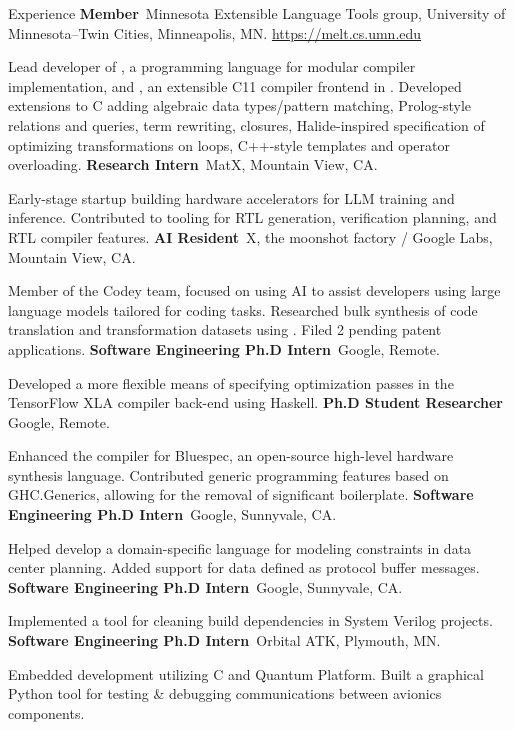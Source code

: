 \begin{rubric}{Experience}
\entry*[2014 -- $\cdots$]%
	\textbf{Member}\, Minnesota Extensible Language Tools group, University of Minnesota--Twin Cities, Minneapolis, MN.
	\url{https://melt.cs.umn.edu}
	\par Lead developer of \silver{}, a programming language for modular compiler
	implementation,
	and \ableC{}, an extensible C11 compiler frontend in \silver{}.
	Developed extensions to C adding algebraic data types/pattern matching, Prolog-style relations and queries,
	term rewriting, closures, Halide-inspired specification of optimizing transformations on loops, C++-style templates and operator overloading.
%
\entry*[2024]%
	\textbf{Research Intern}\, MatX, Mountain View, CA.
	\par Early-stage startup building hardware accelerators for LLM training and inference.
	Contributed to tooling for RTL generation, verification planning, and RTL compiler features.
%
\entry*[2021 -- 2023]%
	\textbf{AI Resident}\, X, the moonshot factory / Google Labs, Mountain View, CA.
	\par Member of the Codey team, focused on using AI to assist developers using large language models tailored for coding tasks.
	Researched bulk synthesis of code translation and transformation datasets using \silver{}.
	Filed 2 pending patent applications.
%
\entry*[2021]%
	\textbf{Software Engineering Ph.D Intern}\, Google, Remote.
	\par Developed a more flexible means of specifying optimization passes in the TensorFlow XLA compiler back-end using Haskell.
%
\entry*[2020 -- 2021]%
	\textbf{Ph.D Student Researcher}\, Google, Remote.
	\par Enhanced the compiler for Bluespec, an open-source high-level hardware synthesis language.
	Contributed generic programming features based on GHC.Generics, allowing for the removal of significant boilerplate.
%
\entry*[2019]%
	\textbf{Software Engineering Ph.D Intern}\, Google, Sunnyvale, CA.
	\par Helped develop a domain-specific language for modeling constraints in data center planning.
	Added support for data defined as protocol buffer messages.
%
\entry*[2018]%
	\textbf{Software Engineering Ph.D Intern}\, Google, Sunnyvale, CA.
	\par Implemented a tool for cleaning build dependencies in System Verilog projects.
%
\entry*[2017]%
	\textbf{Software Engineering Ph.D Intern}\, Orbital ATK, Plymouth, MN.
	\par Embedded development utilizing C and Quantum Platform.
	Built a graphical Python tool for testing \& debugging communications between avionics components.
%
\end{rubric}
